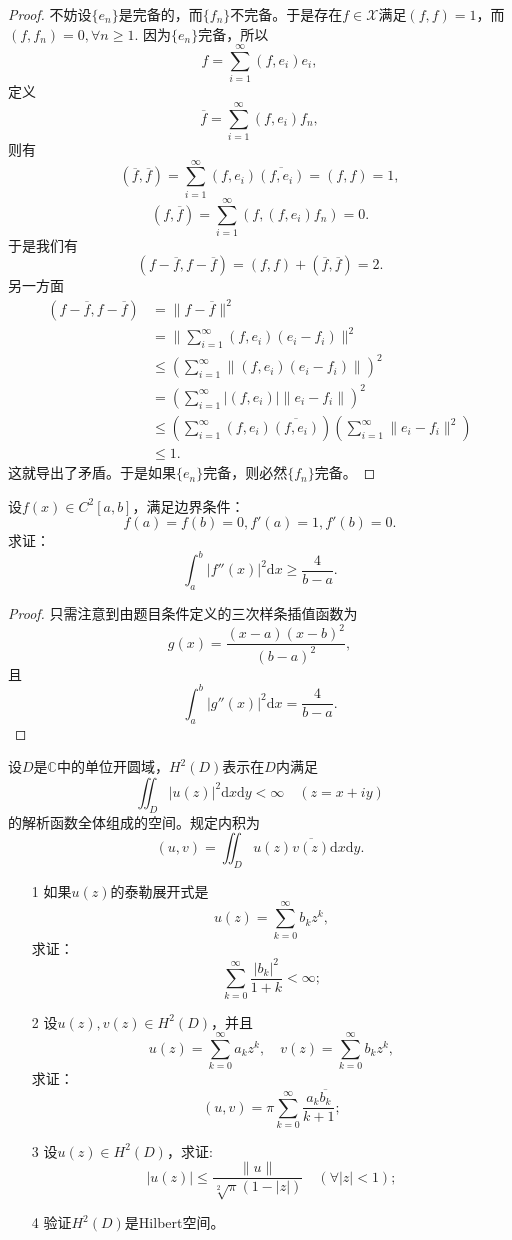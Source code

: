 \begin{proof}
不妨设$\{e_n\}$是完备的，而$\{f_n\}$不完备。于是存在$f\in\mathscr{X}$满足$(f,f)=1$，而$(f,f_n)=0,\forall n\geq1.$
因为$\{e_n\}$完备，所以
$$f=\sum_{i=1}^{\infty}(f,e_i)e_i,$$
定义$$\overline{f}=\sum_{i=1}^{\infty}(f,e_i)f_n,$$
则有$$(\overline{f},\overline{f})=\sum_{i=1}^{\infty}(f,e_i)\overline{(f,e_i)}=(f,f)=1,$$
$$(f,\overline{f})=\sum_{i=1}^{\infty}(f,(f,e_i)f_n)=0.$$
于是我们有
$$(f-\overline{f},f-\overline{f})=(f,f)+(\overline{f},\overline{f})=2.$$
另一方面
\begin{align*}
(f-\overline{f},f-\overline{f})&=\|f-\overline{f}\|^2\\
&=\|\sum_{i=1}^{\infty}(f,e_i)(e_i-f_i)\|^2\\
&\leq(\sum_{i=1}^{\infty}\|(f,e_i)(e_i-f_i)\|)^2\\
&=(\sum_{i=1}^{\infty}|(f,e_i)|\|e_i-f_i\|)^2\\
&\leq(\sum_{i=1}^{\infty}(f,e_i)\overline{(f,e_i)})(\sum_{i=1}^{\infty}\|e_i-f_i\|^2)\\
&\leq1.
\end{align*}
这就导出了矛盾。于是如果$\{e_n\}$完备，则必然$\{f_n\}$完备。
\end{proof}

\begin{exercise}
设$f(x)\in C^2[a,b]$，满足边界条件：
$$f(a)=f(b)=0,f'(a)=1,f'(b)=0.$$
求证：
$$\int_a^b|f''(x)|^2\mathrm{d}x\geq\frac{4}{b-a}.$$
\end{exercise}

\begin{proof}
只需注意到由题目条件定义的三次样条插值函数为
$$g(x)=\frac{(x-a)(x-b)^2}{(b-a)^2},$$
且
$$\int_a^b|g''(x)|^2\mathrm{d}x=\frac{4}{b-a}.$$  
\end{proof}

\begin{exercise}
设$D$是$\mathbb{C}$中的单位开圆域，$H^2(D)$表示在$D$内满足
$$\iint_D|u(z)|^2\mathrm{d}x\mathrm{d}y<\infty\quad(z=x+iy)$$
的解析函数全体组成的空间。规定内积为
$$(u,v)=\iint_Du(z)\overline{v(z)}\mathrm{d}x\mathrm{d}y.$$
\begin{enumerate}
\item[1] 如果$u(z)$的泰勒展开式是
$$u(z)=\sum_{k=0}^{\infty}b_kz^k,$$
求证：
$$\sum_{k=0}^{\infty}\frac{|b_k|^2}{1+k}<\infty;$$
\item[2] 设$u(z),v(z)\in H^2(D)$，并且
$$u(z)=\sum_{k=0}^{\infty}a_kz^k,\quad v(z)=\sum_{k=0}^{\infty}b_kz^k,$$
求证：
$$(u,v)=\pi\sum_{k=0}^{\infty}\frac{a_k\overline{b_k}}{k+1};$$
\item[3] 设$u(z)\in H^2(D)$，求证:
$$|u(z)|\leq\frac{\|u\|}{\sqrt[2]{\pi}(1-|z|)}\quad(\forall|z|<1);$$
\item[4] 验证$H^2(D)$是Hilbert空间。
\end{enumerate}
\end{exercise} 

